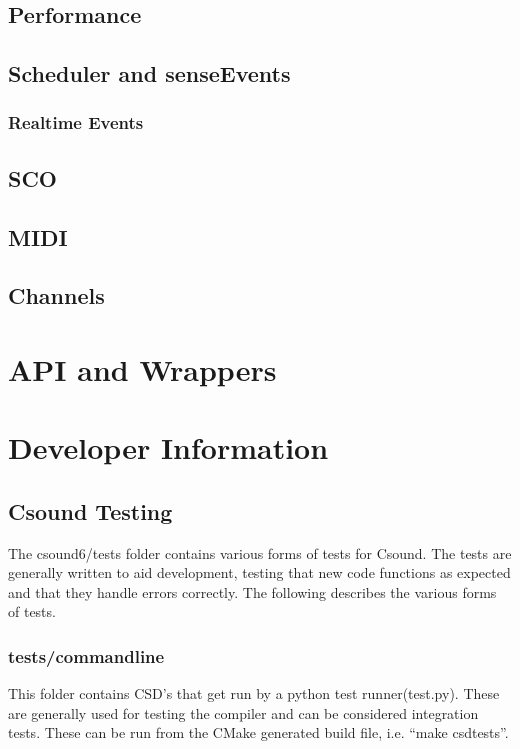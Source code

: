 \documentclass[]{book}
\begin{document}
\section{Performance}

\section{Scheduler and senseEvents}

\subsection{Realtime Events}

\section{SCO}

\section{MIDI}

\section{Channels}


\chapter{API and Wrappers}

\chapter{Developer Information}

\section{Csound Testing}

The csound6/tests folder contains various forms of tests for Csound. The
tests are generally written to aid development, testing that new code
functions as expected and that they handle errors correctly. The
following describes the various forms of tests.

\subsection{tests/commandline}

This folder contains CSD's that get run by a python test
runner(test.py). These are generally used for testing the compiler and
can be considered integration tests. These can be run from the CMake
generated build file, i.e. ``make csdtests''.
\end{document}
